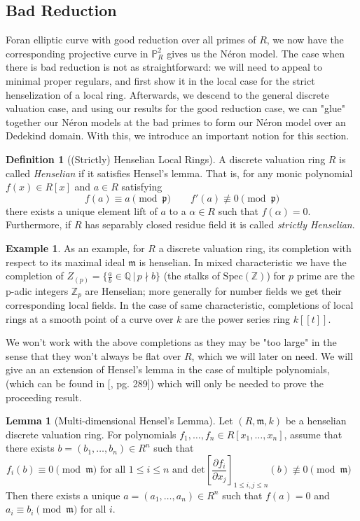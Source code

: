 \documentclass{article}
\theoremstyle{definition}
\newtheorem{lemma}[theorem]{Lemma}
\newtheorem{definition}[theorem]{Definition}
\newtheorem{example}[theorem]{Example}
\theoremstyle{remark}
\theoremstyle{plain}
\newcommand{\Z}{\mathbb{Z}}
\newcommand{\Q}{\mathbb{Q}}
\newcommand{\mb}[1]{\mathbb{#1}}
\newcommand{\mk}[1]{\mathfrak{#1}}
\begin{document}
\subsection{Bad Reduction}

Foran elliptic curve with good reduction over all primes of $R$, we now have the corresponding projective curve in $\mb{P}^2_R$ gives us the N\'eron model.
The case when there is bad reduction is not as straightforward: we will need to appeal to minimal proper regulars, and first show it in the local case for the strict henselization of a local ring.
Afterwards, we descend to the general discrete valuation case, and using our results for the good reduction case, we can "glue" together our N\'eron models at the bad primes to form our N\'eron model over an Dedekind domain.
With this, we introduce an important notion for this section.

\begin{definition}[(Strictly) Henselian Local Rings]
	A discrete valuation ring $R$ is called \textit{Henselian} if it satisfies Hensel's lemma.
	That is, for any monic polynomial $f(x) \in R[x]$ and $a \in R$ satisfying
	\[f(a) \equiv a \pmod{\mk{p}} \quad \quad f'(a) \not\equiv 0 \pmod{\mk{p}}\]
	there exists a unique element lift of $a$ to  a $\alpha \in R$ such that $f(\alpha) = 0$.
	Furthermore, if $R$ has separably closed residue field it is called \textit{strictly Henselian}.
\end{definition}

\begin{example}
	As an example, for $R$ a discrete valuation ring, its completion with respect to its maximal ideal $\mk{m}$ is henselian. 
	In mixed characteristic we have the completion of $Z_{(p)} = \{ \frac{a}{b} \in \Q \,|\, p \nmid b\}$ (the stalks of $\text{Spec}(\Z)$) for $p$ prime are the p-adic integers $\Z_p$ are Henselian; more generally for number fields we get their corresponding local fields.
	In the case of same characteristic, completions of local rings at a smooth point of a curve over $k$ are the power series ring $k[[t]]$.
\end{example}

We won't work with the above completions as they may be "too large" in the sense that they won't always be flat over $R$, which we will later on need.
We will give an an extension of Hensel's lemma in the case of multiple polynomials, (which can be found in [\cite{ROS}, pg. 289]) which will only be needed to prove the proceeding result.

\begin{lemma}[Multi-dimensional Hensel's Lemma]\label{multi-dim-hensel}
	Let $(R, \mk{m}, k)$ be a henselian discrete valuation ring.
	For polynomials $f_1, \dots, f_n \in R[x_1, \dots, x_n]$, assume that there exists $b = (b_1, \dots, b_n) \in R^n$ such that 
	\[\text{$f_i(b) \equiv 0 \pmod{\mk{m}}$ for all $1 \leq i \leq n$ and $\text{det}\left[ \frac{\partial f_i}{\partial x_j}\right]_{1 \leq i,j \leq n}(b) \not\equiv 0 \pmod{\mk{m}}$ } \]
	Then there exists a unique $a = (a_1, \dots, a_n) \in R^n$ such that $f(a) = 0$ and $a_i \equiv b_i \pmod{\mk{m}}$ for all $i$.
\end{lemma}
\end{document}
